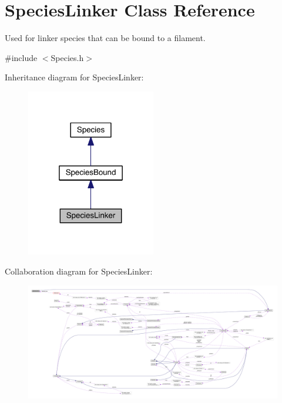 \hypertarget{classSpeciesLinker}{\section{Species\+Linker Class Reference}
\label{classSpeciesLinker}
}


Used for linker species that can be bound to a filament.  




{\ttfamily \#include $<$Species.\+h$>$}



Inheritance diagram for Species\+Linker\+:\nopagebreak
\begin{figure}[H]
\begin{center}
\leavevmode
\includegraphics[width=160pt]{classSpeciesLinker__inherit__graph}
\end{center}
\end{figure}


Collaboration diagram for Species\+Linker\+:\nopagebreak
\begin{figure}[H]
\begin{center}
\leavevmode
\includegraphics[width=350pt]{classSpeciesLinker__coll__graph}
\end{center}
\end{figure}
